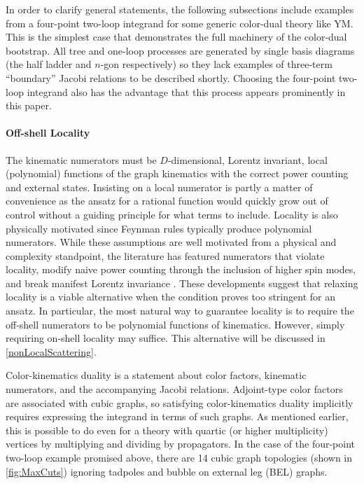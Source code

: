 \documentclass[11pt,letter]{article}
\begin{document}
In order to clarify general statements, the following subsections
include examples from a four-point two-loop integrand for some generic
color-dual theory like YM.  This is the simplest case that
demonstrates the full machinery of the color-dual bootstrap.  All tree
and one-loop processes are generated by single basis diagrams (the half
ladder and $n$-gon respectively) so they lack examples of three-term
``boundary'' Jacobi relations to be described shortly.
Choosing the four-point two-loop integrand also has the advantage that this
process appears prominently in this paper.

\paragraph{Off-shell Locality}

The kinematic numerators must be $D$-dimensional, Lorentz invariant,
local (polynomial) functions of the graph kinematics with the correct
power counting and external states.  Insisting on a local numerator is
partly a matter of convenience as the ansatz for a rational function
would quickly grow out of control without a guiding principle for what
terms to include.  Locality is also physically motivated since Feynman
rules typically produce polynomial numerators.  While these
assumptions are well motivated from a physical and complexity
standpoint, the literature has featured numerators that violate
locality, modify naive power counting through the inclusion of higher
spin modes, and break manifest Lorentz invariance \cite{Square,
  WeinzierlBCJLagrangian, Mogull:2015adi, FivePointN4BCJ,
  Johansson:2017bfl, Ben-Shahar:2022ixa, Cheung:2016prv,
  Cheung:2021zvb}.  These developments suggest that relaxing locality
is a viable alternative when the condition proves too stringent for an
ansatz.  In particular, the most natural way to guarantee locality is
to require the off-shell numerators to be polynomial functions of
kinematics.  However, simply requiring on-shell locality may suffice.
This alternative will be discussed in \cref{nonLocalScattering}.

Color-kinematics duality is a statement about color factors, kinematic
numerators, and the accompanying Jacobi relations.  Adjoint-type color
factors are associated with cubic graphs, so satisfying
color-kinematics duality implicitly requires expressing the integrand
in terms of such graphs. As mentioned earlier, this is possible to do
even for a theory with quartic (or higher multiplicity) vertices by
multiplying and dividing by propagators.  In the case of the four-point
two-loop example promised above, there are 14 cubic graph topologies
(shown in \cref{fig:MaxCuts}) ignoring tadpoles and bubble on external
leg (BEL) graphs.
\end{document}
